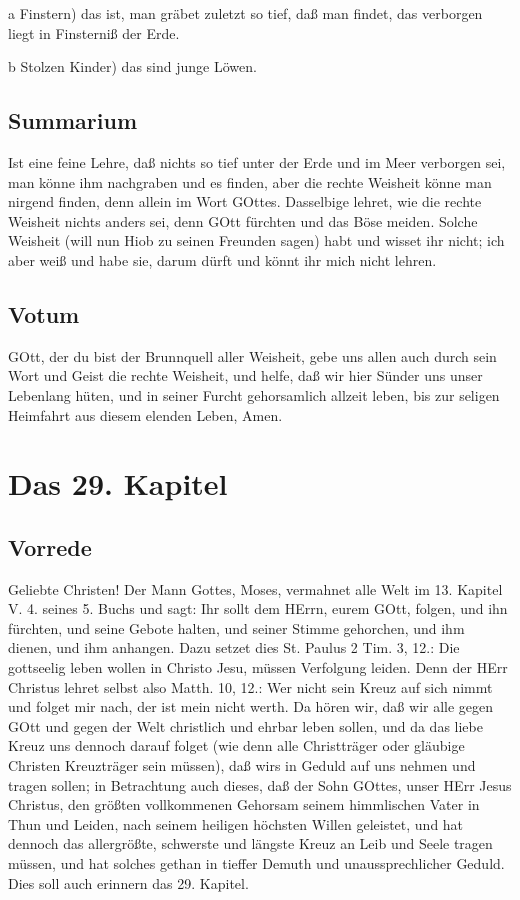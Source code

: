 a Finstern) das ist, man gräbet zuletzt so tief, daß man findet, das verborgen liegt in Finsterniß der Erde.

b Stolzen Kinder) das sind junge Löwen.

\section{Summarium}

Ist eine feine Lehre, daß nichts so tief unter der Erde und im Meer verborgen sei, man könne ihm nachgraben und es finden, aber die rechte Weisheit könne man nirgend finden, denn allein im Wort GOttes. Dasselbige lehret, wie die rechte Weisheit nichts anders sei, denn GOtt fürchten und das Böse meiden. Solche Weisheit (will nun Hiob zu seinen Freunden sagen) habt und wisset ihr nicht; ich aber weiß und habe sie, darum dürft und könnt ihr mich nicht lehren.

\section{Votum}

GOtt, der du bist der Brunnquell aller Weisheit, gebe uns allen auch durch sein Wort und Geist die rechte Weisheit, und helfe, daß wir hier Sünder uns unser Lebenlang hüten, und in seiner Furcht gehorsamlich allzeit leben, bis zur seligen Heimfahrt aus diesem elenden Leben, Amen.

\chapter{Das 29. Kapitel}

\section{Vorrede}

Geliebte Christen! Der Mann Gottes, Moses, vermahnet alle Welt im 13. Kapitel V. 4. seines 5. Buchs und sagt: Ihr sollt dem HErrn, eurem GOtt, folgen, und ihn fürchten, und seine Gebote halten, und seiner Stimme gehorchen, und ihm dienen, und ihm anhangen. Dazu setzet dies St. Paulus 2 Tim. 3, 12.: Die gottseelig leben wollen in Christo Jesu, müssen Verfolgung leiden. Denn der HErr Christus lehret selbst also Matth. 10, 12.: Wer nicht sein Kreuz auf sich nimmt und folget mir nach, der ist mein nicht werth. Da hören wir, daß wir alle gegen GOtt und gegen der Welt christlich und ehrbar leben sollen, und da das liebe Kreuz uns dennoch darauf folget (wie denn alle Christträger oder gläubige Christen Kreuzträger sein müssen), daß wirs in Geduld auf uns nehmen und tragen sollen; in Betrachtung auch dieses, daß der Sohn GOttes, unser HErr Jesus Christus, den größten vollkommenen Gehorsam seinem himmlischen Vater in Thun und Leiden, nach seinem heiligen höchsten Willen geleistet, und hat dennoch das allergrößte, schwerste und längste Kreuz an Leib und Seele tragen müssen, und hat solches gethan in tieffer Demuth und unaussprechlicher Geduld. Dies soll auch erinnern das 29. Kapitel.

